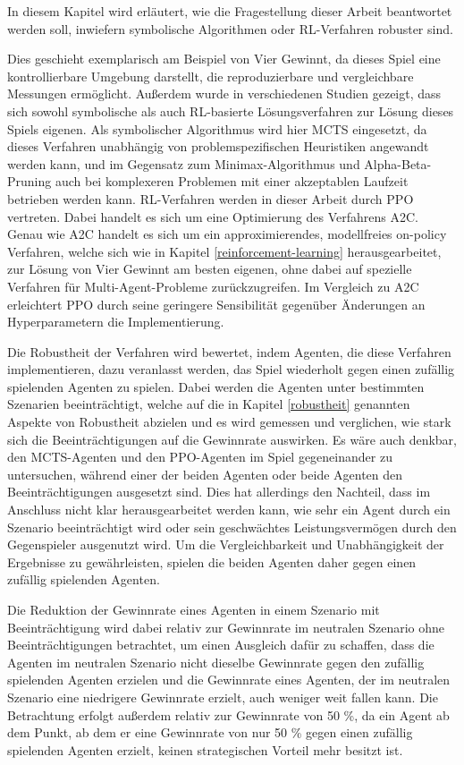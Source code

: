 \label{konzept}

In diesem Kapitel wird erläutert, wie die Fragestellung dieser Arbeit beantwortet werden soll, inwiefern symbolische Algorithmen oder RL-Verfahren robuster sind.

Dies geschieht exemplarisch am Beispiel von Vier Gewinnt, da dieses Spiel eine kontrollierbare Umgebung darstellt, die reproduzierbare und vergleichbare Messungen ermöglicht. Außerdem wurde in verschiedenen Studien gezeigt, dass sich sowohl symbolische als auch RL-basierte Lösungsverfahren zur Lösung dieses Spiels eigenen. Als symbolischer Algorithmus wird hier MCTS eingesetzt, da dieses Verfahren unabhängig von problemspezifischen Heuristiken angewandt werden kann, und im Gegensatz zum Minimax-Algorithmus und Alpha-Beta-Pruning auch bei komplexeren Problemen mit einer akzeptablen Laufzeit betrieben werden kann. RL-Verfahren werden in dieser Arbeit durch PPO vertreten. Dabei handelt es sich um eine Optimierung des Verfahrens A2C. Genau wie A2C handelt es sich um ein approximierendes, modellfreies on-policy Verfahren, welche sich wie in Kapitel \ref{reinforcement-learning} herausgearbeitet, zur Lösung von Vier Gewinnt am besten eigenen, ohne dabei auf spezielle Verfahren für Multi-Agent-Probleme zurückzugreifen. Im Vergleich zu A2C erleichtert PPO durch seine geringere Sensibilität gegenüber Änderungen an Hyperparametern die Implementierung.

Die Robustheit der Verfahren wird bewertet, indem Agenten, die diese Verfahren implementieren, dazu veranlasst werden, das Spiel wiederholt gegen einen zufällig spielenden Agenten zu spielen. Dabei werden die Agenten unter bestimmten Szenarien beeinträchtigt, welche auf die in Kapitel \ref{robustheit} genannten Aspekte von Robustheit abzielen und es wird gemessen und verglichen, wie stark sich die Beeinträchtigungen auf die Gewinnrate auswirken. Es wäre auch denkbar, den MCTS-Agenten und den PPO-Agenten im Spiel gegeneinander zu untersuchen, während einer der beiden Agenten oder beide Agenten den Beeinträchtigungen ausgesetzt sind. Dies hat allerdings den Nachteil, dass im Anschluss nicht klar herausgearbeitet werden kann, wie sehr ein Agent durch ein Szenario beeinträchtigt wird oder sein geschwächtes Leistungsvermögen durch den Gegenspieler ausgenutzt wird. Um die Vergleichbarkeit und Unabhängigkeit der Ergebnisse zu gewährleisten, spielen die beiden Agenten daher gegen einen zufällig spielenden Agenten.

Die Reduktion der Gewinnrate eines Agenten in einem Szenario mit Beeinträchtigung wird dabei relativ zur Gewinnrate im neutralen Szenario ohne Beeinträchtigungen betrachtet, um einen Ausgleich dafür zu schaffen, dass die Agenten im neutralen Szenario nicht dieselbe Gewinnrate gegen den zufällig spielenden Agenten erzielen und die Gewinnrate eines Agenten, der im neutralen Szenario eine niedrigere Gewinnrate erzielt, auch weniger weit fallen kann. Die Betrachtung erfolgt außerdem relativ zur Gewinnrate von 50 \%, da ein Agent ab dem Punkt, ab dem er eine Gewinnrate von nur 50 \% gegen einen zufällig spielenden Agenten erzielt, keinen strategischen Vorteil mehr besitzt ist.

